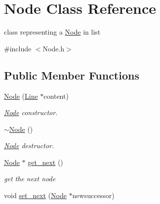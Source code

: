 \hypertarget{classNode}{
\section{Node Class Reference}
\label{classNode}
}


class representing a \hyperlink{classNode}{Node} in list  


{\ttfamily \#include $<$Node.h$>$}\subsection*{Public Member Functions}
\begin{DoxyCompactItemize}
\item 
\hypertarget{classNode_a38b4c6850bd8b7f57986ab2131b09918}{
\hyperlink{classNode_a38b4c6850bd8b7f57986ab2131b09918}{Node} (\hyperlink{classLine}{Line} $\ast$content)}
\label{classNode_a38b4c6850bd8b7f57986ab2131b09918}

\begin{DoxyCompactList}\small\item\em \hyperlink{classNode}{Node} constructor. \item\end{DoxyCompactList}\item 
\hypertarget{classNode_aa0840c3cb5c7159be6d992adecd2097c}{
\hyperlink{classNode_aa0840c3cb5c7159be6d992adecd2097c}{$\sim$Node} ()}
\label{classNode_aa0840c3cb5c7159be6d992adecd2097c}

\begin{DoxyCompactList}\small\item\em \hyperlink{classNode}{Node} destructor. \item\end{DoxyCompactList}\item 
\hypertarget{classNode_a815c897407e2c039c4d86ef42848d8e5}{
\hyperlink{classNode}{Node} $\ast$ \hyperlink{classNode_a815c897407e2c039c4d86ef42848d8e5}{get\_\-next} ()}
\label{classNode_a815c897407e2c039c4d86ef42848d8e5}

\begin{DoxyCompactList}\small\item\em get the next node \item\end{DoxyCompactList}\item 
\hypertarget{classNode_ac33ed514ff8d86b658b6690279386565}{
void \hyperlink{classNode_ac33ed514ff8d86b658b6690279386565}{set\_\-next} (\hyperlink{classNode}{Node} $\ast$newsuccessor)}
\label{classNode_ac33ed514ff8d86b658b6690279386565}


\end{DoxyCompactItemize}
